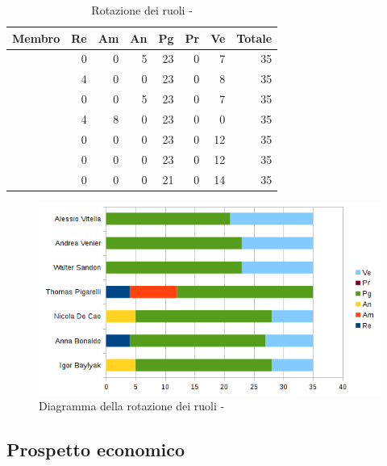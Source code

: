 \documentclass[12pt,a4paper]{article}
\begin{document}
\begin{table}[h]
	\begin{center}
		\begin{tabular}{l r r r r r r r}
			\toprule
			\textbf{Membro}	&	\textbf{Re}	&	\textbf{Am}	& \textbf{An} & \textbf{Pg} & \textbf{Pr} & \textbf{Ve} & \textbf{Totale}\\
			\midrule
			\midrule
			\IB & 0 & 0 & 5 & 23 & 0 & 7 & 35 \\
			\midrule
			\AB & 4 & 0 & 0 & 23 & 0 & 8 & 35 \\
			\midrule
			\NDC & 0 & 0 & 5 & 23 & 0 & 7 & 35 \\
			\midrule
			\TP & 4 & 8 & 0 & 23 & 0 & 0 & 35 \\
			\midrule
			\WS & 0 & 0 & 0 & 23 & 0 & 12 & 35 \\
			\midrule
			\AVE & 0 & 0 & 0 & 23 & 0 & 12 & 35 \\
			\midrule
			\AVI & 0 & 0 & 0 & 21 & 0 & 14 & 35 \\
			\bottomrule
		\end{tabular}
		\caption{Rotazione dei ruoli - \FPA}
	\end{center}
\end{table}

\begin{center}
	\begin{figure}[H]
		\centering		\includegraphics[width=\textwidth]{diagrammaBarreProgettazioneArchitetturaleRotazioneRuoli.png}
		\caption{Diagramma della rotazione dei ruoli - \FPA}
	\end{figure}
\end{center}

\subsection{Prospetto economico}
\end{document}
